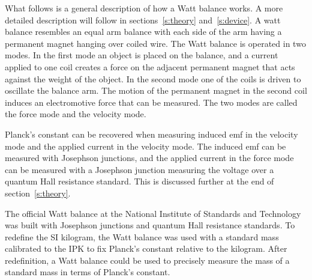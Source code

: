 \documentclass[aps,prstab,reprint,12pt]{revtex4-1}
\begin{document}
What follows is a general description of how a Watt balance works. A more detailed description will follow in sections~\ref{s:theory} and~\ref{s:device}.
A watt balance resembles an equal arm balance with each side of the arm having a permanent magnet hanging over coiled wire. The Watt balance is operated in two modes. In the first mode an object is placed on the balance, and a current applied to one coil creates a force on the adjacent permanent magnet that acts against the weight of the object. In the second mode one of the coils is driven to oscillate the balance arm. The motion of the permanent magnet in the second coil induces an electromotive force that can be measured. The two modes are called the force mode and the velocity mode.



Planck's constant can be recovered when measuring induced emf in the velocity mode and the applied current in the velocity mode. The induced emf can be measured with Josephson junctions, and the applied current in the force mode can be measured with a Josephson junction measuring the voltage over a quantum Hall resistance standard. This is discussed further at the end of section~\ref{s:theory}.



The official Watt balance at the National Institute of Standards and Technology was built with Josephson junctions and quantum Hall resistance standards. To redefine the SI kilogram, the Watt balance was used with a standard mass calibrated to the IPK to fix Planck's constant relative to the kilogram. After redefinition, a Watt balance could be used to precisely measure the mass of a standard mass in terms of Planck's constant.
\end{document}
